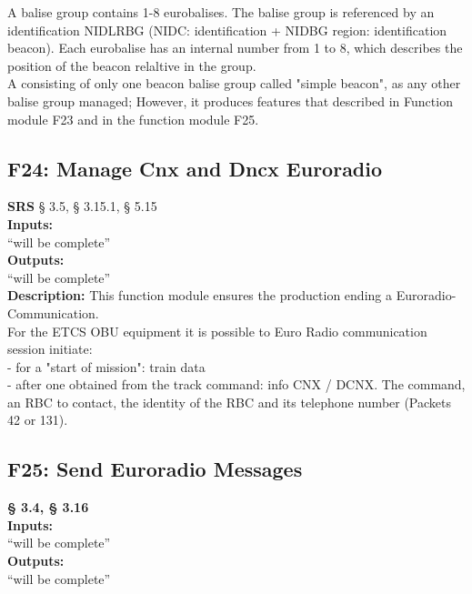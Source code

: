 \documentclass{template/openetcs_report}
\begin{document}
A balise group contains 1-8 eurobalises. 
The balise group is referenced by an identification NIDLRBG (NIDC: identification 
+ NIDBG region: identification beacon). Each eurobalise has an internal number from 1 to 8, 
which describes the position of the beacon relaltive in the group. \\

A consisting of only one beacon balise group called "simple beacon", as 
any other balise group managed; However, it produces features that described in
Function module F23 and in the function module F25.\\

\subsection{F24: Manage Cnx and Dncx Euroradio}
\textbf{SRS} § 3.5, § 3.15.1, § 5.15\\

 \textbf{Inputs:}\\
``will be complete''\\

 \textbf{Outputs:}\\
 ``will be complete''\\
 
\textbf{Description:} 
This function module ensures the production ending a Euroradio- 
Communication. \\
For the ETCS OBU equipment it is possible to Euro Radio communication session
initiate: \\

- for a "start of mission": train data \\

- after one obtained from the track command: info CNX / DCNX. 
The command, an RBC to contact, the identity of the RBC and its telephone number 
(Packets 42 or 131).\\



 \subsection{F25: Send Euroradio Messages}
 \textbf{§ 3.4, § 3.16}\\
 
  \textbf{Inputs:}\\
``will be complete''\\

 \textbf{Outputs:}\\
 ``will be complete''\\
 
\end{document}
